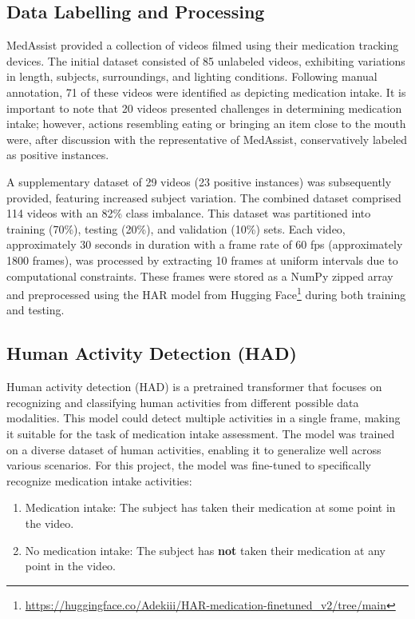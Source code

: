 \documentclass[a4paper,12pt]{article}
\begin{document}
\subsection{Data Labelling and Processing}

MedAssist provided a collection of videos filmed using their medication tracking devices. The initial dataset consisted 
of 85 unlabeled videos, exhibiting variations in length, subjects, surroundings, and lighting conditions. Following 
manual annotation, 71 of these videos were identified as depicting medication intake. It is important to note that 20 videos 
presented challenges in determining medication intake; however, actions resembling eating or bringing an item close to 
the mouth were, after discussion with the representative of MedAssist, conservatively labeled as positive instances.

A supplementary dataset of 29 videos (23 positive instances) was subsequently provided, featuring increased subject variation. 
The combined dataset comprised 114 videos with an 82\% class imbalance. This dataset was partitioned into training (70\%), 
testing (20\%), and validation (10\%) sets. Each video, approximately 30 seconds in duration with a frame rate of 60 fps 
(approximately 1800 frames), was processed by extracting 10 frames at uniform intervals due to computational constraints. 
These frames were stored as a NumPy zipped array and preprocessed using the HAR model from Hugging Face\footnote{\url{https://huggingface.co/Adekiii/HAR-medication-finetuned_v2/tree/main}} during both training and testing.


\subsection{Human Activity Detection (HAD)}
Human activity detection (HAD) is a pretrained transformer that focuses on recognizing
and classifying human activities from different possible data modalities. This model could detect multiple activities in a single frame, making it suitable for the task of medication intake assessment. The model was trained on a diverse dataset of human activities, enabling it to generalize well across various scenarios. For this project, the model was fine-tuned to specifically recognize medication intake activities: 
\renewcommand{\labelenumi}{\Roman{enumi}.}
\begin{enumerate}
    \item Medication intake: The subject has taken their medication at some point in the video.
    \item No medication intake: The subject has \textbf{not} taken their medication at any point in the video.
\end{enumerate}
\end{document}
